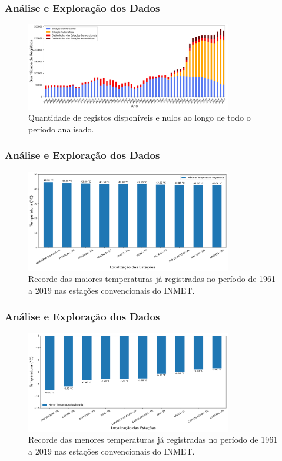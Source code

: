 \documentclass[aspectratio=169]{beamer}
\begin{document}
\begin{frame}
    \frametitle{Análise e Exploração dos Dados}

	\begin{figure}[H]
	\centering
	\caption{Quantidade de registos disponíveis e nulos ao longo de todo o período analisado.}
	\includegraphics[width=0.8\textwidth]{figuras/dados_ausentes_ao_longo_anos.png}
	\end{figure}
\end{frame}

\begin{frame}
    \frametitle{Análise e Exploração dos Dados}

	\begin{figure}[H]
	\centering
	\caption{Recorde das maiores temperaturas já registradas no período de 1961 a 2019 nas estações convencionais do INMET.}
	\includegraphics[width=0.8\textwidth]{figuras/estacoes_convencionais_maiores_temperaturas.png}
	\end{figure}
\end{frame}


\begin{frame}
    \frametitle{Análise e Exploração dos Dados}

	\begin{figure}[H]
	\centering
	\caption{Recorde das menores temperaturas já registradas no período de 1961 a 2019 nas estações convencionais do INMET.}
	\includegraphics[width=0.8\textwidth]{figuras/estacoes_convencionais_menores_temperaturas.png}
	\end{figure}
\end{frame}
\end{document}

